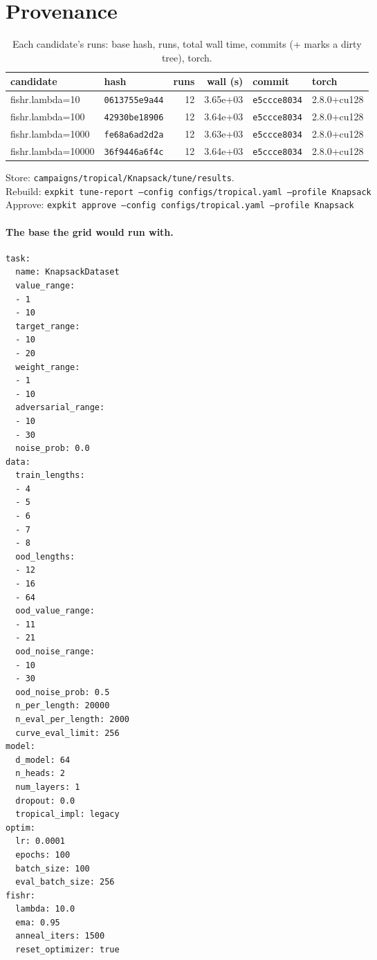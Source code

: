 \documentclass[10pt]{article}
\begin{document}
\section{Provenance}
{\small
\begin{longtable}{llrrll}
\caption{Each candidate's runs: base hash, runs, total wall time, commits (+ marks a dirty tree), torch.}\label{tab:provenance}\\
\toprule
candidate & hash & runs & wall (s) & commit & torch\\
\midrule
\endhead
fishr.lambda=10 & \texttt{0613755e9a44} & 12 & 3.65e+03 & \texttt{e5ccce8034} & 2.8.0+cu128\\
fishr.lambda=100 & \texttt{42930be18906} & 12 & 3.64e+03 & \texttt{e5ccce8034} & 2.8.0+cu128\\
fishr.lambda=1000 & \texttt{fe68a6ad2d2a} & 12 & 3.63e+03 & \texttt{e5ccce8034} & 2.8.0+cu128\\
fishr.lambda=10000 & \texttt{36f9446a6f4c} & 12 & 3.64e+03 & \texttt{e5ccce8034} & 2.8.0+cu128\\
\bottomrule
\end{longtable}
}
\noindent Store: \texttt{campaigns/tropical/Knapsack/tune/results}.\\
Rebuild: \texttt{expkit tune-report --config configs/tropical.yaml --profile Knapsack}\\
Approve: \texttt{expkit approve --config configs/tropical.yaml --profile Knapsack}

\paragraph{The base the grid would run with.}
{\footnotesize
\begin{verbatim}
task:
  name: KnapsackDataset
  value_range:
  - 1
  - 10
  target_range:
  - 10
  - 20
  weight_range:
  - 1
  - 10
  adversarial_range:
  - 10
  - 30
  noise_prob: 0.0
data:
  train_lengths:
  - 4
  - 5
  - 6
  - 7
  - 8
  ood_lengths:
  - 12
  - 16
  - 64
  ood_value_range:
  - 11
  - 21
  ood_noise_range:
  - 10
  - 30
  ood_noise_prob: 0.5
  n_per_length: 20000
  n_eval_per_length: 2000
  curve_eval_limit: 256
model:
  d_model: 64
  n_heads: 2
  num_layers: 1
  dropout: 0.0
  tropical_impl: legacy
optim:
  lr: 0.0001
  epochs: 100
  batch_size: 100
  eval_batch_size: 256
fishr:
  lambda: 10.0
  ema: 0.95
  anneal_iters: 1500
  reset_optimizer: true
\end{verbatim}
}

\clearpage
\appendix
\end{document}
